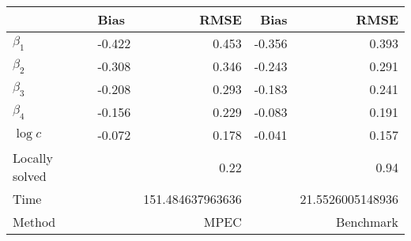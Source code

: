 
\begin{tabular}[t]{llrrr}
\toprule
  & Bias & RMSE & Bias & RMSE\\
\midrule
$\beta_{1}$ & -0.422 & 0.453 & -0.356 & 0.393\\
$\beta_{2}$ & -0.308 & 0.346 & -0.243 & 0.291\\
$\beta_{3}$ & -0.208 & 0.293 & -0.183 & 0.241\\
$\beta_{4}$ & -0.156 & 0.229 & -0.083 & 0.191\\
$\log c$ & -0.072 & 0.178 & -0.041 & 0.157\\
Locally solved &  & 0.22 &  & 0.94\\
Time &  & 151.484637963636 &  & 21.5526005148936\\
Method &  & MPEC &  & Benchmark\\
\bottomrule
\end{tabular}
